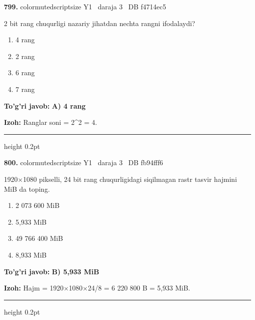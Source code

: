 \documentclass[10pt,a4paper,oneside]{article}
\begin{document}
\noindent\textbf{\color{ink}799.}  {color{muted}scriptsize Y1 \textbullet\ daraja 3 \textbullet\ DB f4714ec5}
\par
2 bit rang chuqurligi nazariy jihatdan nechta rangni ifodalaydi?
\begin{enumerate}[label=\Alph*),leftmargin=9mm]
\item 4 rang
\item 2 rang
\item 6 rang
\item 7 rang
\end{enumerate}
\begin{tcolorbox}[enhanced,breakable,colback=teal!4,colframe=teal!50!black,boxrule=0.5pt,arc=1.1mm,left=3mm,right=3mm,top=1.7mm,bottom=1.7mm,before skip=2mm,after skip=2mm]
\textbf{\color{teal}To'g'ri javob:} \textbf{A) 4 rang}
\par\smallskip
\textbf{Izoh:} Ranglar soni = 2\textasciicircum{}2 = 4.
\end{tcolorbox}
\vspace{2mm}\hrule height 0.2pt \vspace{3mm}

\noindent\textbf{\color{ink}800.}  {color{muted}scriptsize Y1 \textbullet\ daraja 3 \textbullet\ DB fb94fff6}
\par
1920\ensuremath{\times}1080 pikselli, 24 bit rang chuqurligidagi siqilmagan rastr tasvir hajmini MiB da toping.
\begin{enumerate}[label=\Alph*),leftmargin=9mm]
\item 2 073 600 MiB
\item 5,933 MiB
\item 49 766 400 MiB
\item 8,933 MiB
\end{enumerate}
\begin{tcolorbox}[enhanced,breakable,colback=teal!4,colframe=teal!50!black,boxrule=0.5pt,arc=1.1mm,left=3mm,right=3mm,top=1.7mm,bottom=1.7mm,before skip=2mm,after skip=2mm]
\textbf{\color{teal}To'g'ri javob:} \textbf{B) 5,933 MiB}
\par\smallskip
\textbf{Izoh:} Hajm = 1920\ensuremath{\times}1080\ensuremath{\times}24/8 = 6 220 800 B = 5,933 MiB.
\end{tcolorbox}
\vspace{2mm}\hrule height 0.2pt \vspace{3mm}
\end{document}
